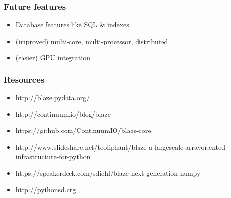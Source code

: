 \documentclass{beamer}
\begin{document}
\begin{frame}
\frametitle{Future features}
\begin{itemize}
\item Database features like SQL \& indexes
\item (improved) multi-core, multi-processor, distributed
\item (easier) GPU integration
\end{itemize}
\end{frame}


\begin{frame}
\frametitle{Resources}
\begin{itemize}
\item http://blaze.pydata.org/
\item http://continuum.io/blog/blaze
\item https://github.com/ContinuumIO/blaze-core
\item http://www.slideshare.net/teoliphant/blaze-a-largescale-arrayoriented-infrastructure-for-python
\item https://speakerdeck.com/sdiehl/blaze-next-generation-numpy
\item http://pythonsd.org
\end{itemize}
\end{frame}


\end{document}
